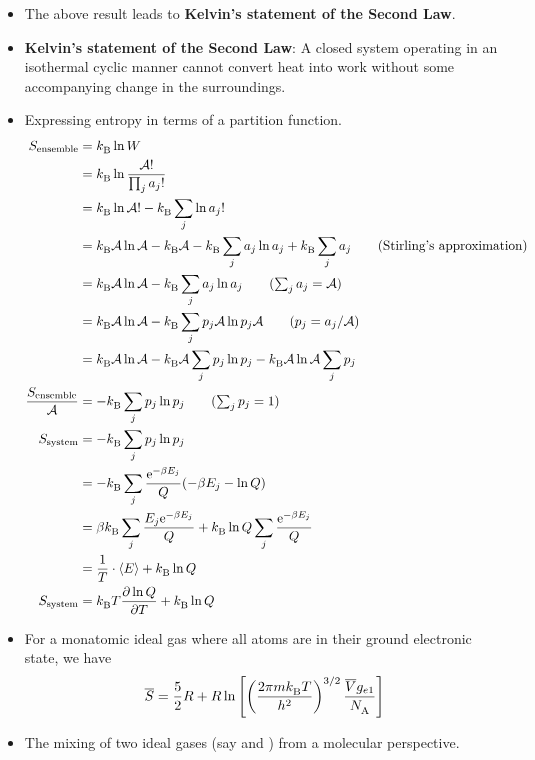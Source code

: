 \documentclass[../notes.tex]{subfiles}
\begin{document}
\begin{itemize}
    \item The above result leads to \textbf{Kelvin's statement of the Second Law}.
    \item \textbf{Kelvin's statement of the Second Law}: A closed system operating in an isothermal cyclic manner cannot convert heat into work without some accompanying change in the surroundings.
    \item Expressing entropy in terms of a partition function.
    \begingroup
    \allowdisplaybreaks
    \begin{align*}
        S_\text{ensemble} &= \kB\ln W\\
        &= \kB\ln\frac{\mathcal{A}!}{\prod_ja_j!}\\
        &= \kB\ln\mathcal{A}!-\kB\sum_j\ln a_j!\\
        &= \kB\mathcal{A}\ln\mathcal{A}-\kB\mathcal{A}-\kB\sum_ja_j\ln a_j+\kB\sum_ja_j\tag{Stirling's approximation}\\
        &= \kB\mathcal{A}\ln\mathcal{A}-\kB\sum_ja_j\ln a_j\tag{$\sum_ja_j=\mathcal{A}$}\\
        &= \kB\mathcal{A}\ln\mathcal{A}-\kB\sum_jp_j\mathcal{A}\ln p_j\mathcal{A}\tag{$p_j=a_j/\mathcal{A}$}\\
        &= \kB\mathcal{A}\ln\mathcal{A}-\kB\mathcal{A}\sum_jp_j\ln p_j-\kB\mathcal{A}\ln\mathcal{A}\sum_jp_j\\
        \frac{S_\text{ensemble}}{\mathcal{A}} &= -\kB\sum_jp_j\ln p_j\tag{$\sum_jp_j=1$}\\
        S_\text{system} &= -\kB\sum_jp_j\ln p_j\\
        &= -\kB\sum_j\frac{\e[-\beta E_j]}{Q}(-\beta E_j-\ln Q)\\
        &= \beta\kB\sum_j\frac{E_j\e[-\beta E_j]}{Q}+\kB\ln Q\sum_j\frac{\e[-\beta E_j]}{Q}\\
        &= \frac{1}{T}\cdot\prb{E}+\kB\ln Q\\
        S_\text{system} &= \kB T\pdv{\ln Q}{T}+\kB\ln Q
    \end{align*}
    \endgroup
    \item For a monatomic ideal gas where all atoms are in their ground electronic state, we have
    \begin{equation*}
        \overline{S} = \frac{5}{2}R+R\ln\left[ \left( \frac{2\pi m{k_\text{B}^{}} T}{h^2} \right)^{3/2}\frac{\overline{V}g_{e1}}{{N_\text{A}^{}}} \right]
    \end{equation*}
    \item The mixing of two ideal gases (say  and ) from a molecular perspective.

\end{itemize}
\end{document}
